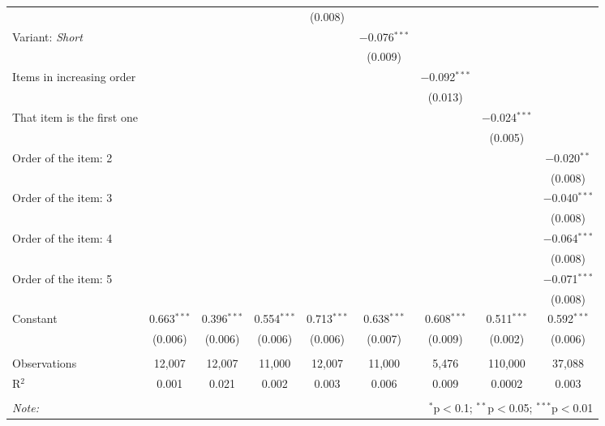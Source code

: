 \begin{tabular}{@{\extracolsep{5pt}}lcccccccc}
  &  &  &  & (0.008) &  &  &  &  \\ 
  Variant: \textit{Short} &  &  &  &  & $-$0.076$^{***}$ &  &  &  \\ 
  &  &  &  &  & (0.009) &  &  &  \\ 
  Items in increasing order &  &  &  &  &  & $-$0.092$^{***}$ &  &  \\ 
  &  &  &  &  &  & (0.013) &  &  \\ 
  That item is the first one &  &  &  &  &  &  & $-$0.024$^{***}$ &  \\ 
  &  &  &  &  &  &  & (0.005) &  \\ 
  Order of the item: 2 &  &  &  &  &  &  &  & $-$0.020$^{**}$ \\ 
  &  &  &  &  &  &  &  & (0.008) \\ 
  Order of the item: 3 &  &  &  &  &  &  &  & $-$0.040$^{***}$ \\ 
  &  &  &  &  &  &  &  & (0.008) \\ 
  Order of the item: 4 &  &  &  &  &  &  &  & $-$0.064$^{***}$ \\ 
  &  &  &  &  &  &  &  & (0.008) \\ 
  Order of the item: 5 &  &  &  &  &  &  &  & $-$0.071$^{***}$ \\ 
  &  &  &  &  &  &  &  & (0.008) \\ 
  Constant & 0.663$^{***}$ & 0.396$^{***}$ & 0.554$^{***}$ & 0.713$^{***}$ & 0.638$^{***}$ & 0.608$^{***}$ & 0.511$^{***}$ & 0.592$^{***}$ \\ 
  & (0.006) & (0.006) & (0.006) & (0.006) & (0.007) & (0.009) & (0.002) & (0.006) \\ 
 \hline \\[-1.8ex] 
Observations & 12,007 & 12,007 & 11,000 & 12,007 & 11,000 & 5,476 & 110,000 & 37,088 \\ 
R$^{2}$ & 0.001 & 0.021 & 0.002 & 0.003 & 0.006 & 0.009 & 0.0002 & 0.003 \\ 
\hline 
\hline \\[-1.8ex] 
\textit{Note:}  & \multicolumn{8}{r}{$^{*}$p$<$0.1; $^{**}$p$<$0.05; $^{***}$p$<$0.01} \\ 
\end{tabular} 
